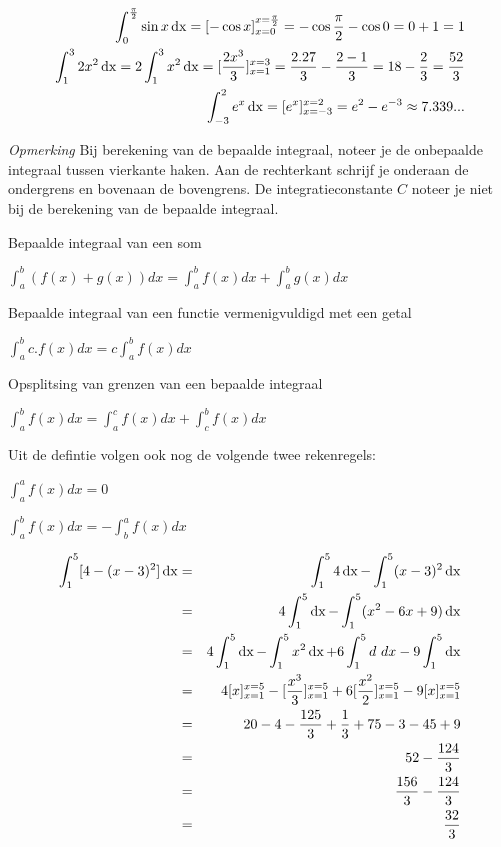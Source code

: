 \begin{voorbeeld}
	\begin{eqnarray*}
		\int_{0}^{\frac{\pi}{2}} \sin x \operatorname{dx} = [-\cos x]_{x=0}^{x=\frac{\pi}{2}}=-\cos \frac{\pi}{2}-\cos 0 = 0+1 = 1 \\
		\int_{1}^{3} 2x^2 \operatorname{dx} = 2\int_{1}^{3} x^2 \operatorname{dx} = [\frac{2x^3}{3}]_{x=1}^{x=3}=\frac{2.27}{3}-\frac{2-1}{3}=18-\frac{2}{3}=\frac{52}{3} \\
		\int_{-3}^{2} e^x \operatorname{dx} = [e^x]_{x=-3}^{x=2}=e^2-e^{-3}\approx 7.339...
	\end{eqnarray*}
\end{voorbeeld}

\emph{Opmerking}
Bij berekening van de bepaalde integraal, noteer je de onbepaalde integraal tussen vierkante haken. Aan de rechterkant schrijf je onderaan de ondergrens en bovenaan de bovengrens. De integratieconstante $C$ noteer je niet bij de berekening van de bepaalde integraal.

\begin{eigenschap} Bepaalde integraal van een som
	
	$\boxed { \int^b_a (f(x)+g(x))dx = \int^b_a f(x)dx + \int^b_a g(x)dx }$
\end{eigenschap}

\begin{eigenschap} Bepaalde integraal van een functie vermenigvuldigd met een getal
	
	$\boxed { \int^b_a c.f(x)dx = c \int^b_a f(x)dx}$
\end{eigenschap}

\begin{eigenschap} Opsplitsing van grenzen van een bepaalde integraal
	
	$\boxed { \int^b_a f(x) dx = \int^c_a f(x)dx + \int^b_c f(x)dx }$
\end{eigenschap}

\noindent Uit de defintie volgen ook nog de volgende twee rekenregels:

$\boxed { \int^a_a f(x) dx = 0}$

$\boxed { \int^b_a f(x) dx = - \int^a_b f(x) dx }$

\begin{voorbeeld}
	\begin{eqnarray*}
	\int_{1}^{5} [4-(x-3)^2] \operatorname{dx} &=& \int_{1}^{5} 4 \operatorname{dx} - \int_{1}^{5} (x-3)^2 \operatorname{dx} \\
	&=& 4 \int_{1}^{5} \operatorname{dx} - \int_{1}^{5} (x^2-6x+9) \operatorname{dx} \\
	&=& 4 \int_{1}^{5} \operatorname{dx} - \int_{1}^{5} x^2 \operatorname{dx} +6 \int_{1}^{5} d\ dx - 9 \int_{1}^{5} \operatorname{dx} \\
	&=& 4[x]_{x=1}^{x=5}-[\frac{x^3}{3}]_{x=1}^{x=5}+6[\frac{x^2}{2}]_{x=1}^{x=5}-9[x]_{x=1}^{x=5} \\
	&=& 20-4-\frac{125}{3}+\frac{1}{3}+75-3-45+9 \\
	&=& 52 - \frac{124}{3} \\
	&=& \frac{156}{3} - \frac{124}{3} \\
	&=& \frac{32}{3} \\
	\end{eqnarray*}
\end{voorbeeld}


